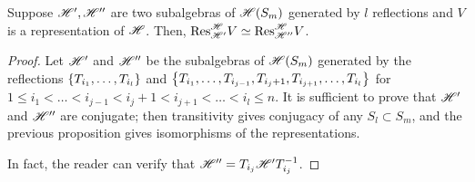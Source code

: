 \documentclass{amsart}
\begin{document}
\begin{corollary}
  Suppose $\mathscr{H}',\mathscr{H}''$ are two subalgebras of $\mathscr{H}(S_m)$ generated by $l$ reflections and $V$ is a representation of $\mathscr{H}$.
  Then, $\text{Res}_{\mathscr{H}'}^{\mathscr{H}} V \simeq \text{Res}_{\mathscr{H}''}^{\mathscr{H}} V$.
\end{corollary}
\begin{proof}
  Let $\mathscr{H}'$ and $\mathscr{H}''$ be the subalgebras of $\mathscr{H}(S_m)$ generated by the reflections $\left\{ T_{i_1},\dots,T_{i_l} \right\}$ and $\left\{ T_{i_1},\dots,T_{i_{j-1}},T_{i_j + 1},T_{i_{j+1}},\dots,T_{i_l} \right\}$ for $1 \leq i_1 < \dots < i_{j-1} < i_j + 1 < i_{j+1} < \dots < i_l \leq n$.
  It is sufficient to prove that $\mathscr{H}'$ and $\mathscr{H}''$ are conjugate;
  then transitivity gives conjugacy of any $S_l \subset S_m$, and the previous proposition gives isomorphisms of the representations.
  
  In fact, the reader can verify that $\mathscr{H}'' = T_{i_j}\mathscr{H}'T_{i_j}^{-1}$.
\end{proof}

 
 
\end{document}
